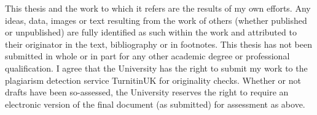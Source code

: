 
\begin{declaration}

This thesis and the work to which it refers are the results of my own efforts. Any ideas, data, images or text resulting from the work of others (whether published or unpublished) are fully identified as such within the work and attributed to their originator in the text, bibliography or in footnotes. This thesis has not been submitted in whole or in part for any other academic degree or professional qualification.  I agree that the University has the right to submit my work to the plagiarism detection service TurnitinUK for originality checks.
Whether or not drafts have been so-assessed, the University reserves the right to require an electronic version of the final document (as submitted) for assessment as above. \\\\

%

\end{declaration}
